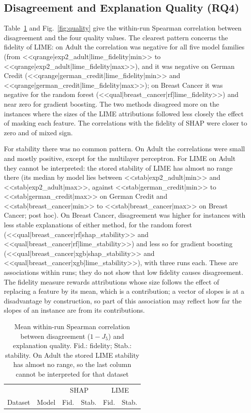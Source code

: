 \documentclass{cys}
\begin{document}
\subsection{Disagreement and Explanation Quality (RQ4)}

Table~\ref{tab:quality} and Fig.~\ref{fig:quality} give the within-run Spearman
correlation between disagreement and the four quality values. The clearest pattern
concerns the fidelity of LIME: on Adult the correlation was negative for all five model
families (from <<qrange|exp2_adult|lime_fidelity|min>> to
<<qrange|exp2_adult|lime_fidelity|max>>), and it was negative on German Credit
(<<qrange|german_credit|lime_fidelity|min>> and
<<qrange|german_credit|lime_fidelity|max>>); on Breast Cancer it was negative for the
random forest (<<qual|breast_cancer|rf|lime_fidelity>>) and near zero for gradient
boosting. The two methods disagreed more on the
instances where the sizes of the LIME attributions followed less closely the effect of
masking each feature. The
correlations with the fidelity of SHAP were closer to zero and of mixed sign.

For stability there was no common pattern. On Adult the correlations were small and
mostly positive, except for the multilayer perceptron. For LIME on Adult they cannot be
interpreted: the stored stability of LIME has almost no range there (its median by model
lies between <<stab|exp2_adult|min>> and <<stab|exp2_adult|max>>, against
<<stab|german_credit|min>> to <<stab|german_credit|max>> on German Credit and
<<stab|breast_cancer|min>> to <<stab|breast_cancer|max>> on Breast Cancer; post hoc). On
Breast Cancer, disagreement was higher for instances with less stable explanations of
either method, for the random forest (<<qual|breast_cancer|rf|shap_stability>> and
<<qual|breast_cancer|rf|lime_stability>>) and less so for gradient boosting
(<<qual|breast_cancer|xgb|shap_stability>> and <<qual|breast_cancer|xgb|lime_stability>>),
with three runs each. These are associations within runs; they do not show that low fidelity
causes disagreement. The fidelity measure rewards attributions whose size follows the
effect of replacing a feature by its mean, which is a contribution; a vector of slopes is
at a disadvantage by construction, so part of this association may reflect how far the
slopes of an instance are from its contributions.

\begin{table}[t]
\renewcommand{\arraystretch}{\tablestretch}
\centering
\caption{Mean within-run Spearman correlation between disagreement ($1 - J_5$) and explanation quality. Fid.: fidelity; Stab.: stability. On Adult the stored LIME stability has almost no range, so the last column cannot be interpreted for that dataset}
\label{tab:quality}
\small
\setlength{\tabcolsep}{\mediumcolsep}
\begin{tabular}{llrrrr}
\hline
 & & \multicolumn{2}{c}{SHAP} & \multicolumn{2}{c}{LIME} \\
Dataset & Model & Fid. & Stab. & Fid. & Stab. \\
\hline

\end{tabular}
\end{table}
\end{document}
